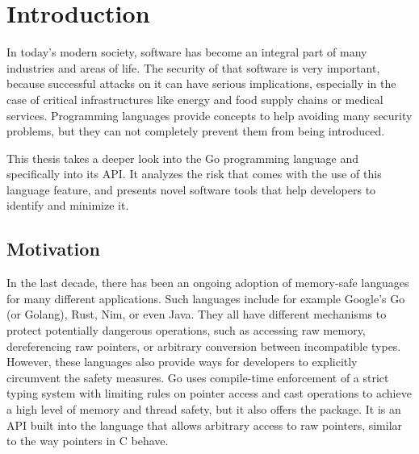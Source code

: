 
\chapter{Introduction}\label{ch:introduction}

In today's modern society, software has become an integral part of many industries and areas of life.
The security of that software is very important, because successful attacks on it can have serious implications,
especially in the case of critical infrastructures like energy and food supply chains or medical services.
Programming languages provide concepts to help avoiding many security problems, but they can not completely prevent
them from being introduced.

This thesis takes a deeper look into the Go programming language and specifically into its \unsafe{} \acrshort{API}.
It analyzes the risk that comes with the use of this language feature, and presents novel software tools that help
developers to identify and minimize it.



\section{Motivation}\label{sec:motivation}

In the last decade, there has been an ongoing adoption of memory-safe languages for many different applications.
Such languages include for example Google's Go (or Golang), Rust, Nim, or even Java.
They all have different mechanisms to protect potentially dangerous operations, such as accessing raw memory,
dereferencing raw pointers, or arbitrary conversion between incompatible types.
However, these languages also provide ways for developers to explicitly circumvent the safety measures.
Go uses compile-time enforcement of a strict typing system with limiting rules on pointer access and cast operations
to achieve a high level of memory and thread safety, but it also offers the \unsafe{} package.
It is an \acrshort{API} built into the language that allows arbitrary access to raw pointers, similar to the way
pointers in C behave.

